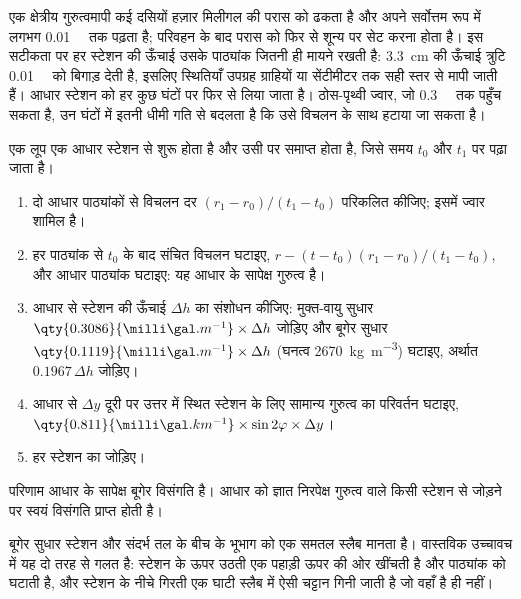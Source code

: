 एक क्षेत्रीय गुरुत्वमापी कई दसियों हज़ार
मिलीगल की परास को ढकता है और अपने सर्वोत्तम रूप में लगभग \qty{0.01}{\milli\gal} तक पढ़ता है;
परिवहन के बाद परास को फिर से शून्य पर सेट करना होता है। इस सटीकता पर हर स्टेशन की ऊँचाई
उसके पाठ्यांक जितनी ही मायने रखती है: \qty{3.3}{cm} की ऊँचाई त्रुटि
\qty{0.01}{\milli\gal} को बिगाड़ देती है, इसलिए स्थितियाँ
उपग्रह ग्राहियों या सेंटीमीटर तक सही स्तर से मापी जाती हैं। आधार स्टेशन को
हर कुछ घंटों पर फिर से लिया जाता है। ठोस-पृथ्वी ज्वार, जो
\qty{0.3}{\milli\gal} तक पहुँच सकता है, उन घंटों में इतनी धीमी गति से बदलता है
कि उसे विचलन के साथ हटाया जा सकता है।

\begin{method}[गुरुत्व लूप का समानयन]\label{met:b3:field-lab-methods-3:loop}
एक लूप एक आधार स्टेशन से शुरू होता है और उसी पर समाप्त होता है, जिसे समय $t_0$ और $t_1$ पर पढ़ा जाता है।
\begin{enumerate}
  \item दो आधार पाठ्यांकों से विचलन दर $(r_1 - r_0)/(t_1 - t_0)$ परिकलित कीजिए;
        इसमें ज्वार शामिल है।
  \item हर पाठ्यांक से $t_0$ के बाद संचित विचलन घटाइए,
        $r - (t - t_0)(r_1 - r_0)/(t_1 - t_0)$, और आधार पाठ्यांक घटाइए:
        यह आधार के सापेक्ष गुरुत्व है।
  \item आधार से स्टेशन की ऊँचाई $\Delta h$ का संशोधन कीजिए:
        मुक्त-वायु सुधार $\qty{0.3086}{\milli\gal.m^{-1}}
        \times\Delta h$ जोड़िए और बूगेर सुधार
        $\qty{0.1119}{\milli\gal.m^{-1}}\times\Delta h$ (घनत्व
        \qty{2670}{kg.m^{-3}}) घटाइए, अर्थात $0.1967\,\Delta h$ जोड़िए।
  \item आधार से $\Delta y$ दूरी पर उत्तर में स्थित स्टेशन के लिए सामान्य गुरुत्व का
        परिवर्तन घटाइए, $\qty{0.811}{\milli\gal.km^{-1}}
        \times\sin 2\varphi\times\Delta y$।
  \item हर स्टेशन का  जोड़िए।
\end{enumerate}
परिणाम आधार के सापेक्ष बूगेर विसंगति है। आधार को
ज्ञात निरपेक्ष गुरुत्व वाले किसी स्टेशन से जोड़ने पर स्वयं विसंगति प्राप्त होती है।
\end{method}

बूगेर सुधार स्टेशन और संदर्भ तल के बीच के भूभाग को
एक समतल स्लैब मानता है। वास्तविक उच्चावच में यह दो तरह से गलत है:
स्टेशन के ऊपर उठती एक पहाड़ी ऊपर की ओर खींचती है और
पाठ्यांक को घटाती है, और स्टेशन के नीचे गिरती एक घाटी
स्लैब में ऐसी चट्टान गिनी जाती है जो वहाँ है ही नहीं।


